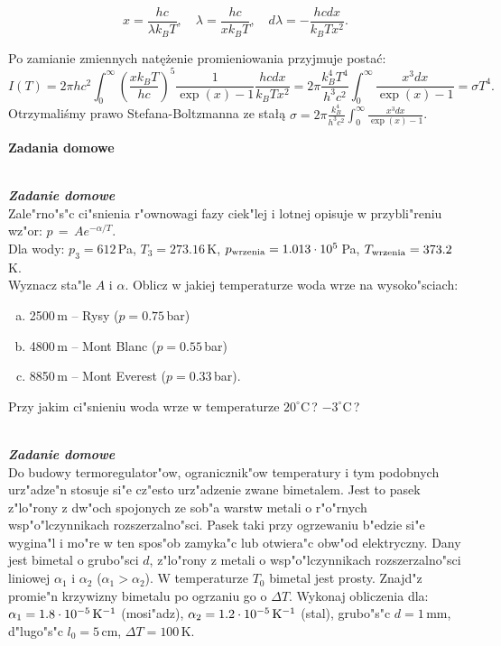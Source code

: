 \documentclass[11pt,a4paper]{article}
\newcounter{zaddom}\newcommand{\zaddom}[1][]{\addtocounter{zaddom}{1} ~\\  {\bf \emph{Zadanie domowe \arabic{zaddom} #1 }} \\}
\begin{document}
\begin{equation}
x = \frac{h c}{\lambda k_B T}, \quad \lambda = \frac{h c}{x k_B T},\quad d\lambda = - \frac{h c dx}{k_B T x^2}.
\end{equation}

Po zamianie zmiennych natężenie promieniowania przyjmuje postać:
\begin{equation}
  I(T) = 2 \pi h c^2 \int_0^\infty \left(\frac{xk_B T}{hc}\right)^5 \frac{1}{\exp(x)-1}
  \frac{h c dx}{k_B T x^2} =
  2 \pi \frac{k_B^4 T^4}{h^3 c^2} \int_0^\infty \frac{x^3 dx}{\exp(x)-1} = \sigma T^4.
\end{equation}
Otrzymaliśmy prawo Stefana-Boltzmanna ze stałą $\sigma = 2 \pi \frac{k_B^4}{ h^3 c^2} \int_0^\infty \frac{x^3 dx}{\exp(x)-1}$.

\pagebreak
\begin{centering}
\bf{ Zadania domowe }\\[1mm]
\end{centering}
\vspace{1mm}

\zaddom
Zale"rno"s"c ci"snienia r"ownowagi fazy ciek"lej i lotnej opisuje 
w przybli"reniu wz"or: $ p \,=\, A e^{-\alpha/T} $.\\
Dla wody: $p_3 = 612\,$Pa, $T_3 = 273.16\,$K, 
$p_{\rm wrzenia} = 1.013\cdot 10^5\,$Pa, 
$T_{\rm wrzenia} = 373.2\,$K.\\ 
Wyznacz sta"le $A$ i $\alpha$.
Oblicz w jakiej temperaturze woda wrze na wysoko"sciach:
\begin{enumerate}[a)] 
\item 2500\,m -- Rysy ($p = 0.75\,$bar)
\item 4800\,m -- Mont Blanc ($p = 0.55\,$bar)
\item 8850\,m -- Mont Everest ($p = 0.33\,$bar).
\end{enumerate}
Przy jakim ci"snieniu woda wrze w temperaturze $20^\circ$C\,? $-3^\circ$C\,?

\zaddom
Do budowy termoregulator"ow, ogranicznik"ow temperatury i tym
podobnych urz"adze"n stosuje si"e cz"esto urz"adzenie zwane bimetalem.
Jest to pasek z"lo"rony z dw"och spojonych ze sob"a warstw metali
o r"o"rnych wsp"o"lczynnikach rozszerzalno"sci.
Pasek taki przy ogrzewaniu b"edzie si"e wygina"l i mo"re
w ten spos"ob zamyka"c lub otwiera"c obw"od elektryczny.
Dany jest bimetal o grubo"sci $d$, z"lo"rony z metali
o wsp"o"lczynnikach rozszerzalno"sci liniowej $\alpha_1$ i $\alpha_2$
($\alpha_1 > \alpha_2$).
W temperaturze $T_0$ bimetal jest prosty.
Znajd"z promie"n krzywizny bimetalu po ogrzaniu go o $\Delta T$.
Wykonaj obliczenia dla: $\alpha_1=1.8\cdot 10^{-5}\,{\rm K}^{-1}$ (mosi"adz),
$\alpha_2=1.2\cdot 10^{-5}\,{\rm K}^{-1}$ (stal), grubo"s"c $d=1\,$mm,
d"lugo"s"c $l_0=5\,$cm, $\Delta T=100\,$K.
\end{document}
